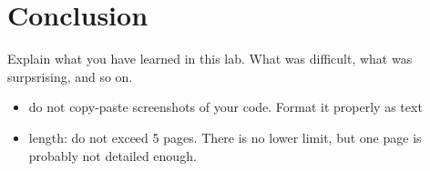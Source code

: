 \chapter{Conclusion}

Explain what you have learned in this lab. What was difficult, what was surpsrising, and so on.


\begin{itemize}
\item do not copy-paste screenshots of your code. Format it properly as text
\item length: do not exceed 5 pages. There is no lower limit, but one page is probably not detailed enough.
\end{itemize}